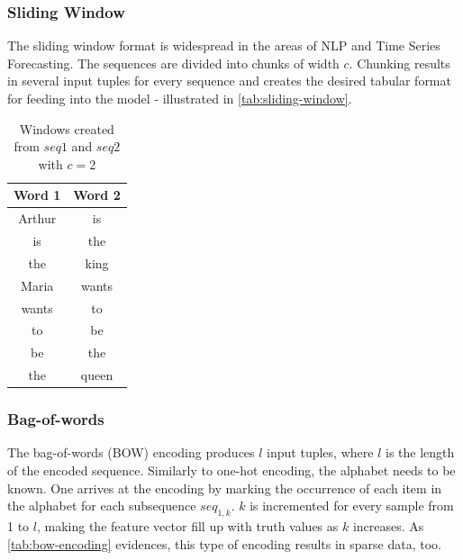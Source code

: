\subsubsection*{Sliding Window}
The sliding window format is widespread in the areas of NLP and Time Series Forecasting. The sequences are divided into chunks of width $c$. Chunking results in several input tuples for every sequence and creates the desired tabular format for feeding into the model - illustrated in \autoref{tab:sliding-window}.

\begin{table}
    \centering
    \begin{tabular}{cc}
        Word 1 & Word 2\\
        \midrule
        Arthur & is\\
        is & the\\
        the & king\\
        Maria & wants\\
        wants & to\\
        to & be\\
        be & the\\
        the & queen
    \end{tabular}
    \caption{Windows created from $seq1$ and $seq2$ with $c=2$}
    \label{tab:sliding-window}
\end{table}

\subsubsection*{Bag-of-words}
The bag-of-words (BOW) encoding produces $l$ input tuples, where $l$ is the length of the encoded sequence. Similarly to one-hot encoding, the alphabet needs to be known. One arrives at the encoding by marking the occurrence of each item in the alphabet for each subsequence $seq_{1,k}$. $k$ is incremented for every sample from 1 to $l$, making the feature vector fill up with truth values as $k$ increases. As \autoref{tab:bow-encoding} evidences, this type of encoding results in sparse data, too.

